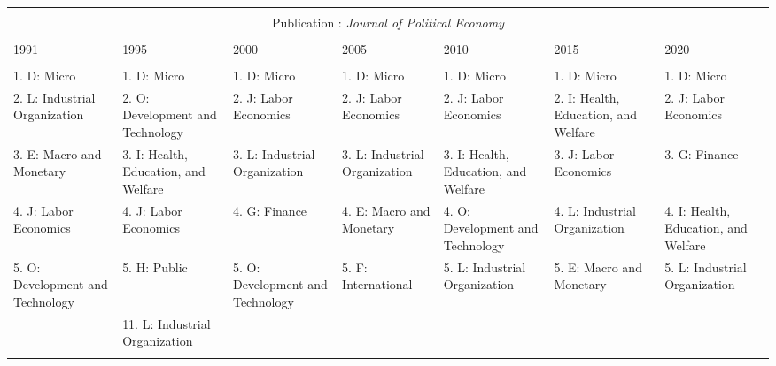 
\begin{table}[h] \centering 
  \caption{} 
  \label{} 
\begin{adjustbox}{max width = \textwidth}
\scriptsize 
\begin{tabular}{@{\extracolsep{5pt}} lllllll} 
\\[-1.8ex]\hline 
\hline \\[-1.8ex] \multicolumn{7}{c}{Publication : \textit{Journal of Political Economy}} \\
 \cline{1-7} \\
1991 & 1995 & 2000 & 2005 & 2010 & 2015 & 2020 \\ 
\hline \\[-1.8ex] 
1. D: Micro & 1. D: Micro & 1. D: Micro & 1. D: Micro & 1. D: Micro & 1. D: Micro & 1. D: Micro \\ 
2. L: Industrial Organization & 2. O: Development and Technology & 2. J: Labor Economics & 2. J: Labor Economics & 2. J: Labor Economics & 2. I: Health, Education, and Welfare & 2. J: Labor Economics \\ 
3. E: Macro and Monetary & 3. I: Health, Education, and Welfare & 3. L: Industrial Organization & 3. L: Industrial Organization & 3. I: Health, Education, and Welfare & 3. J: Labor Economics & 3. G: Finance \\ 
4. J: Labor Economics & 4. J: Labor Economics & 4. G: Finance & 4. E: Macro and Monetary & 4. O: Development and Technology & 4. L: Industrial Organization & 4. I: Health, Education, and Welfare \\ 
5. O: Development and Technology & 5. H: Public & 5. O: Development and Technology & 5. F: International & 5. L: Industrial Organization & 5. E: Macro and Monetary & 5. L: Industrial Organization \\ 
 & 11. L: Industrial Organization &  &  &  &  &  \\ 
\hline \\[-1.8ex] 
\end{tabular} 
\end{adjustbox} 
\end{table} 
